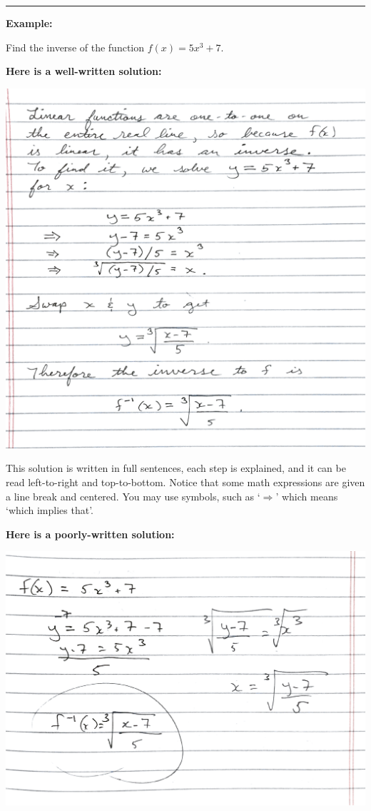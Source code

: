 \documentclass{amsart}
\begin{document}
\vfill
\noindent\rule{\textwidth}{1pt}
\vfill

\textbf{Example:}

Find the inverse of the function $ f(x)= 5x^3 + 7 $.

\vfill
\pagebreak

\noindent
\textbf{Here is a well-written solution:}
\begin{center}
  \includegraphics[scale=0.75]{assets/homework_example_good.pdf}
\end{center}

\noindent
This solution is written in full sentences, each step is
explained, and it can be read left-to-right and
top-to-bottom. Notice that some math expressions are given a
line break and centered.  You may use symbols, such as
`$ \Rightarrow $' which means `which implies that'.
\pagebreak

\noindent
\textbf{Here is a poorly-written solution:}
\begin{center}
  \includegraphics[scale=0.5]{assets/homework_example_bad.pdf}
\end{center}
\end{document}
